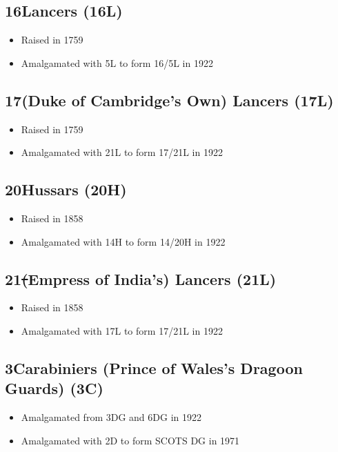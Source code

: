 \subsection*{16\nth Lancers (16L)}

\begin{itemize}
\item Raised in 1759
\item Amalgamated with 5L to form 16/5L in 1922
\end{itemize}

\subsection*{17\nth (Duke of Cambridge's Own) Lancers (17L)}

\begin{itemize}
\item Raised in 1759
\item Amalgamated with 21L to form 17/21L in 1922
\end{itemize}

\subsection*{20\nth Hussars (20H)}

\begin{itemize}
\item Raised in 1858
\item Amalgamated with 14H to form 14/20H in 1922
\end{itemize}

\subsection*{21\st (Empress of India's) Lancers (21L)}

\begin{itemize}
\item Raised in 1858
\item Amalgamated with 17L to form 17/21L in 1922
\end{itemize}

\subsection*{3\rd Carabiniers (Prince of Wales's Dragoon Guards) (3C)}

\begin{itemize}
\item Amalgamated from 3DG and 6DG in 1922
\item Amalgamated with 2D to form SCOTS DG in 1971
\end{itemize}

